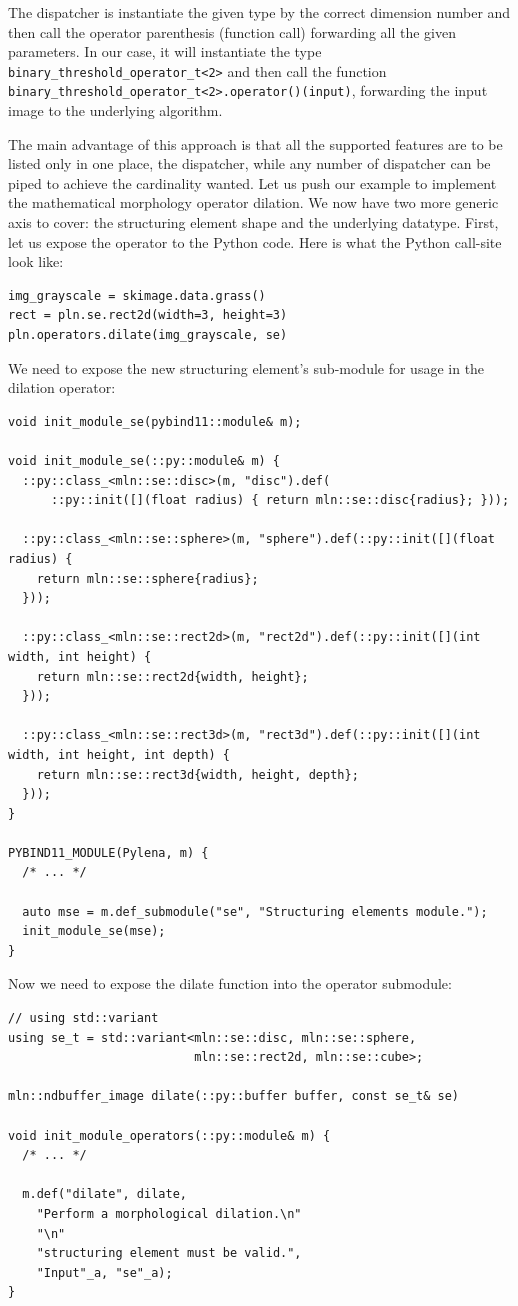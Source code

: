 The dispatcher is instantiate the given type by the correct dimension number and then call the operator parenthesis
(function call) forwarding all the given parameters. In our case, it will instantiate the type
\texttt{binary\_threshold\_operator\_t<2>} and then call the function
\texttt{binary\_threshold\_operator\_t<2>.operator()(input)}, forwarding the input image to the underlying algorithm.

The main advantage of this approach is that all the supported features are to be listed only in one place, the
dispatcher, while any number of dispatcher can be piped to achieve the cardinality wanted. Let us push our example to
implement the mathematical morphology operator dilation. We now have two more generic axis to cover: the structuring
element shape and the underlying datatype. First, let us expose the operator to the Python code. Here is what the Python call-site look like:

\begin{verbatim}
img_grayscale = skimage.data.grass()
rect = pln.se.rect2d(width=3, height=3)
pln.operators.dilate(img_grayscale, se)
\end{verbatim}

We need to expose the new structuring element's sub-module for usage in the dilation operator:

\begin{verbatim}
void init_module_se(pybind11::module& m);

void init_module_se(::py::module& m) {
  ::py::class_<mln::se::disc>(m, "disc").def(
      ::py::init([](float radius) { return mln::se::disc{radius}; }));

  ::py::class_<mln::se::sphere>(m, "sphere").def(::py::init([](float radius) {
    return mln::se::sphere{radius};
  }));

  ::py::class_<mln::se::rect2d>(m, "rect2d").def(::py::init([](int width, int height) {
    return mln::se::rect2d{width, height};
  }));

  ::py::class_<mln::se::rect3d>(m, "rect3d").def(::py::init([](int width, int height, int depth) {
    return mln::se::rect3d{width, height, depth};
  }));
}

PYBIND11_MODULE(Pylena, m) {
  /* ... */

  auto mse = m.def_submodule("se", "Structuring elements module.");
  init_module_se(mse);
}
\end{verbatim}

Now we need to expose the dilate function into the operator submodule:
\begin{verbatim}
// using std::variant
using se_t = std::variant<mln::se::disc, mln::se::sphere,
                          mln::se::rect2d, mln::se::cube>;

mln::ndbuffer_image dilate(::py::buffer buffer, const se_t& se)

void init_module_operators(::py::module& m) {
  /* ... */

  m.def("dilate", dilate,
    "Perform a morphological dilation.\n"
    "\n"
    "structuring element must be valid.",
    "Input"_a, "se"_a);
}
\end{verbatim}

